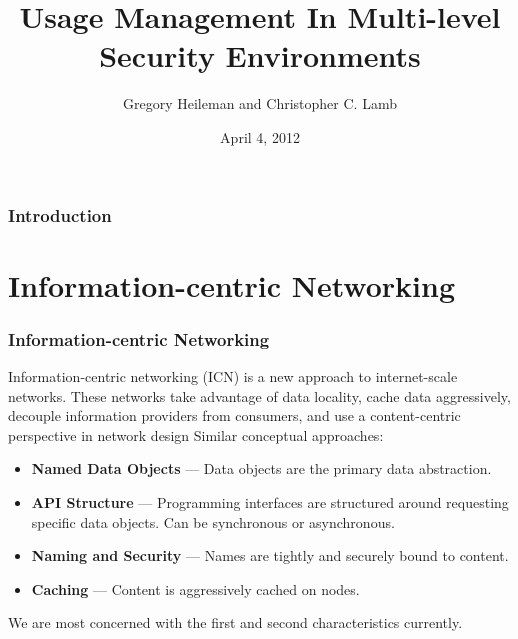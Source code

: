 \documentclass[t,handout, 10pt]{beamer}
\title{Usage Management In Multi-level Security Environments}
\author [Greg, Chris]{Gregory Heileman and Christopher C. Lamb}
\institute[University of New Mexico]{
\inst {}Department of Electrical and Computer Engineering\\
University of New Mexico}
\date{April 4, 2012}
\begin{document}
\begin{frame}
\titlepage
\end{frame}


\begin{frame}
\frametitle{Introduction}
\tableofcontents 
\end{frame}

\section{Information-centric Networking}
\begin{frame}
\frametitle{Information-centric Networking}

Information-centric networking (ICN) is a new approach to internet-scale networks.  These networks take advantage of data locality, cache data aggressively, decouple information providers from consumers, and use a content-centric perspective in network design
\pause
\newline
\newline
Similar conceptual approaches:
{\small
\begin{itemize}
\item {\bf Named Data Objects} --- Data objects are the primary data abstraction.
\item {\bf API Structure} --- Programming interfaces are structured around requesting specific data objects.  Can be synchronous or asynchronous.
\item {\bf Naming and Security} --- Names are tightly and securely bound to content.
\item {\bf Caching} --- Content is aggressively cached on nodes.
\end{itemize}
}
\pause
We are most concerned with the first and second characteristics currently.
\end{frame}
\end{document}
